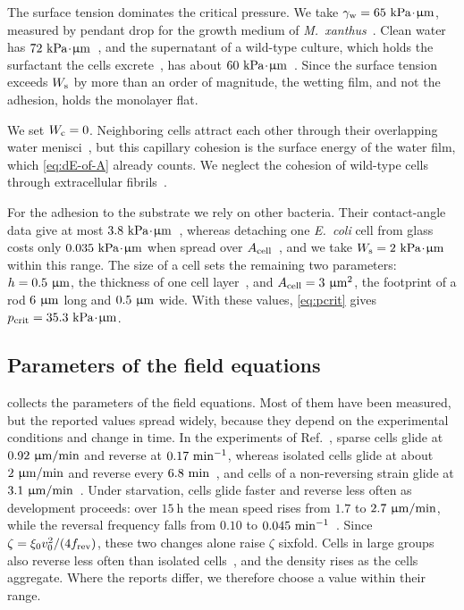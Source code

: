 \documentclass[aps,pre,reprint,superscriptaddress,longbibliography,nofootinbib
]{revtex4-2}
\begin{document}
The surface tension dominates the critical pressure. We
take $\gammaw=65~\kPa\tcdot\micron$, measured by pendant
drop for the growth medium of
\textit{M.\ xanthus}~\cite{bourque2025active}. Clean water
has $72~\kPa\tcdot\micron$~\cite{vargaftik1983}, and the
supernatant of a wild-type culture, which holds the
surfactant the cells excrete~\cite{dworkin1983b,islam2020},
has about $60~\kPa\tcdot\micron$~\cite{islam2020}. Since
the surface tension exceeds $\Ws$ by more than an order of
magnitude, the wetting film, and not the adhesion, holds
the monolayer flat.

We set $\Wc=0$. Neighboring cells attract each other
through their overlapping water
menisci~\cite{black2025capillary}, but this capillary
cohesion is the surface energy of the water film, which
\cref{eq:dE-of-A} already counts. We neglect the cohesion
of wild-type cells through extracellular
fibrils~\cite{shimkets1986correlation,
behmlander1994biochemical,pelling2005nanoscale}.

For the adhesion to the substrate we rely on other
bacteria. Their contact-angle data give at most
$3.8~\kPa\tcdot\micron$~\cite{bayoudh2006quantification},
whereas detaching one \textit{E.\ coli} cell from glass
costs only $0.035~\kPa\tcdot\micron$ when spread over
$\Acell$~\cite{duanisassaf2024factors}, and we take
$\Ws=2~\kPa\tcdot\micron$ within this range. The size of a
cell sets the remaining two parameters: $h=0.5~\micron$,
the thickness of one cell layer~\cite{han2025local}, and
$\Acell=3~\micron^2$, the footprint of a rod $6~\micron$
long and $0.5~\micron$ wide. With these values,
\cref{eq:pcrit} gives $\pcrit=35.3~\kPa\tcdot\micron$.


\subsection{Parameters of the field equations}
\label{app:parameters-choice}

 collects the parameters of the
field equations. Most of them have been measured, but the
reported values spread widely, because they depend on the
experimental conditions and change in time. In the
experiments of Ref.~\cite{copenhagen2021}, sparse cells
glide at $0.92~\micron/\minute$ and reverse at
$0.17~\minute^{-1}$, whereas isolated cells glide at about
$2~\micron/\minute$ and reverse every
$6.8~\minute$~\cite{blackhart1985frizzy}, and cells of a
non-reversing strain glide at
$3.1~\micron/\minute$~\cite{peruani2012collective}. Under
starvation, cells glide faster and reverse less often as
development proceeds: over $15~\mathrm h$ the mean speed
rises from $1.7$ to $2.7~\micron/\minute$, while the
reversal frequency falls from $0.10$ to
$0.045~\minute^{-1}$~\cite{jelsbak2002pattern,
liu2019selfdriven}. Since $\zeta=\xi_0v_0^2/(4\frev)$,
these two changes alone raise $\zeta$ sixfold. Cells in
large groups also reverse less often than isolated
cells~\cite{shi1996cell}, and the density rises as the
cells aggregate. Where the reports differ, we therefore
choose a value within their range.
\end{document}

